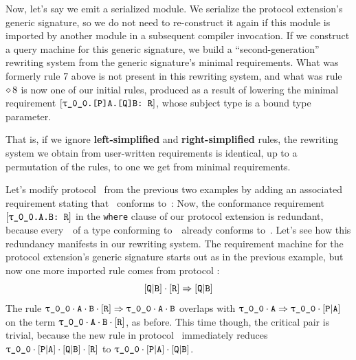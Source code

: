 \documentclass[../generics]{subfiles}
\begin{document}
\begin{example}
Now, let's say we emit a serialized module. We serialize the protocol extension's generic signature, so we do not need to re-construct it again if this module is imported by another module in a subsequent compiler invocation. If we construct a query machine for this generic signature, we build a ``second-generation'' rewriting system from the generic signature's minimal requirements. What was formerly rule 7 above is not present in this rewriting system, and what was rule $\diamond\, 8$ is now one of our initial rules, produced as a result of lowering the minimal requirement $\ConfReq{\rT.[P]A.[Q]B}{R}$, whose subject type is a bound type parameter.

That is, if we ignore \textbf{left-simplified} and \textbf{right-simplified} rules, the rewriting system we obtain from user-written requirements is identical, up to a permutation of the rules, to one we get from minimal requirements.
\end{example}

\begin{example}
Let's modify protocol \tQ\ from the previous two examples by adding an associated requirement stating that \nB\ conforms to~\tR:
Now, the conformance requirement $\ConfReq{\rT.A.B}{R}$ in the \texttt{where} clause of our protocol extension is redundant, because every~\nB\ of a type conforming to~\tQ\ already conforms to~\tR. Let's see how this redundancy manifests in our rewriting system. The requirement machine for the protocol extension's generic signature starts out as in the previous example, but now one more imported rule comes from protocol \tQ:
\[[\texttt{Q}|\texttt{B}]\cdot[\texttt{R}]\Rightarrow [\texttt{Q}|\texttt{B}]\]
The rule $\ProtoConf{\rT\cdot\nA\cdot\nB}{R}$ overlaps with $\rT\cdot\nA\Red\rT\cdot\aPA$ on the term $\rT\cdot\nA\cdot\nB\cdot\pR$, as before. This time though, the critical pair is trivial, because the new rule in protocol \tQ\ immediately reduces $\rT\cdot\aPA\cdot\aQB\cdot\pR$ to $\rT\cdot\aPA\cdot\aQB$.
\end{example}
\end{document}
